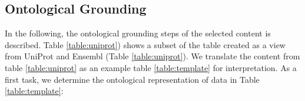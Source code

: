 %
%



\subsection{Ontological Grounding}

In the following, the ontological grounding steps of the selected content is described. 
%
Table \ref{table:uniprot}) shows a subset of the table created as a view from UniProt and Ensembl (Table \ref{table:uniprot}). We translate the content from table \ref{table:uniprot} as an example table \ref{table:template} for interpretation. 
As a first task, we determine the ontological representation of data in Table \ref{table:template}: 

